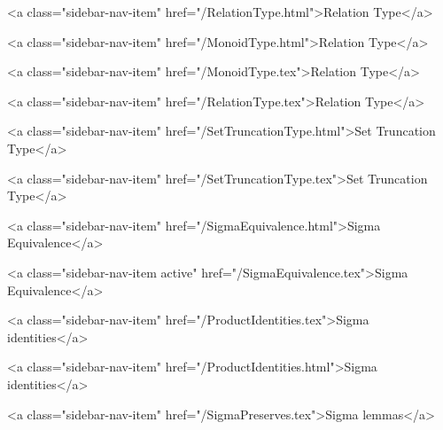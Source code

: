       
    
      
        
          <a class="sidebar-nav-item" href="/RelationType.html">Relation Type</a>
        
      
    
      
        
          <a class="sidebar-nav-item" href="/MonoidType.html">Relation Type</a>
        
      
    
      
        
          <a class="sidebar-nav-item" href="/MonoidType.tex">Relation Type</a>
        
      
    
      
        
          <a class="sidebar-nav-item" href="/RelationType.tex">Relation Type</a>
        
      
    
      
        
          <a class="sidebar-nav-item" href="/SetTruncationType.html">Set Truncation Type</a>
        
      
    
      
        
          <a class="sidebar-nav-item" href="/SetTruncationType.tex">Set Truncation Type</a>
        
      
    
      
        
          <a class="sidebar-nav-item" href="/SigmaEquivalence.html">Sigma Equivalence</a>
        
      
    
      
        
          <a class="sidebar-nav-item active" href="/SigmaEquivalence.tex">Sigma Equivalence</a>
        
      
    
      
        
          <a class="sidebar-nav-item" href="/ProductIdentities.tex">Sigma identities</a>
        
      
    
      
        
          <a class="sidebar-nav-item" href="/ProductIdentities.html">Sigma identities</a>
        
      
    
      
        
          <a class="sidebar-nav-item" href="/SigmaPreserves.tex">Sigma lemmas</a>
        
